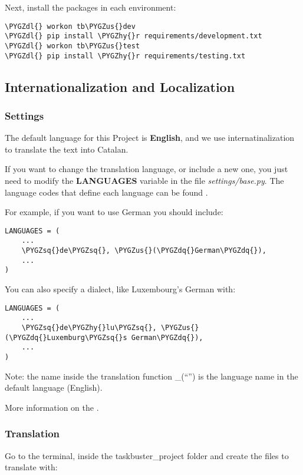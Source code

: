 \documentclass[letterpaper,10pt,english]{sphinxmanual}
\def\PYGZus{\char`\_}
\def\PYGZdl{\char`\$}
\def\PYGZhy{\char`\-}
\def\PYGZsq{\char`\'}
\def\PYGZdq{\char`\"}
\renewcommand\PYGZsq{\textquotesingle}
\begin{document}
Next, install the packages in each environment:

\begin{Verbatim}[commandchars=\\\{\}]
\PYGZdl{} workon tb\PYGZus{}dev
\PYGZdl{} pip install \PYGZhy{}r requirements/development.txt
\PYGZdl{} workon tb\PYGZus{}test
\PYGZdl{} pip install \PYGZhy{}r requirements/testing.txt
\end{Verbatim}


\subsection{Internationalization and Localization}
\label{quick_start:internationalization-and-localization}

\subsubsection{Settings}
\label{quick_start:settings}
The default language for this Project is \textbf{English}, and we use internatinalization to translate the text into Catalan.

If you want to change the translation language, or include a new one, you just need to modify the \textbf{LANGUAGES} variable in the file \emph{settings/base.py}. The language codes that define each language can be found .

For example, if you want to use German you should include:

\begin{Verbatim}[commandchars=\\\{\}]
LANGUAGES = (
    ...
    \PYGZsq{}de\PYGZsq{}, \PYGZus{}(\PYGZdq{}German\PYGZdq{}),
    ...
)
\end{Verbatim}

You can also specify a dialect, like Luxembourg's German with:

\begin{Verbatim}[commandchars=\\\{\}]
LANGUAGES = (
    ...
    \PYGZsq{}de\PYGZhy{}lu\PYGZsq{}, \PYGZus{}(\PYGZdq{}Luxemburg\PYGZsq{}s German\PYGZdq{}),
    ...
)
\end{Verbatim}

Note: the name inside the translation function \_(``'') is the language name in the default language (English).

More information on the .


\subsubsection{Translation}
\label{quick_start:translation}
Go to the terminal, inside the taskbuster\_project folder and create the files to translate with:
\end{document}

